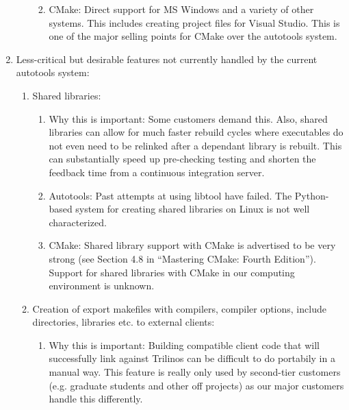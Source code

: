 \documentclass[pdf,ps2pdf,11pt]{SANDreport}
\begin{document}
\begin{enumerate}
\begin{enumerate}
\begin{enumerate}
    {}\item CMake: Direct support for MS Windows and a variety of
    other systems.  This includes creating project files for Visual
    Studio.  This is one of the major selling points for CMake over
    the autotools system.

    \end{enumerate}

  \end{enumerate}

{}\item Less-critical but desirable features not currently handled by
the current autotools system:

  \begin{enumerate}

  {}\item Shared libraries:

    \begin{enumerate}

    {}\item Why this is important: Some customers demand this.  Also,
    shared libraries can allow for much faster rebuild cycles where
    executables do not even need to be relinked after a dependant
    library is rebuilt.  This can substantially speed up pre-checking
    testing and shorten the feedback time from a continuous
    integration server.

    {}\item Autotools: Past attempts at using libtool have failed.
    The Python-based system for creating shared libraries on Linux is
    not well characterized.

    {}\item CMake: Shared library support with CMake is advertised to
    be very strong (see Section 4.8 in ``Mastering CMake: Fourth
    Edition'').  Support for shared libraries with CMake in our
    computing environment is unknown.

    \end{enumerate}

  {}\item Creation of export makefiles with compilers, compiler
  options, include directories, libraries etc. to external clients:

    \begin{enumerate}

    {}\item Why this is important: Building compatible client code
    that will successfully link against Trilinos can be difficult to
    do portabily in a manual way.  This feature is really only used by
    second-tier customers (e.g. graduate students and other off
    projects) as our major customers handle this differently.


\end{enumerate}
\end{enumerate}
\end{enumerate}
\end{document}
